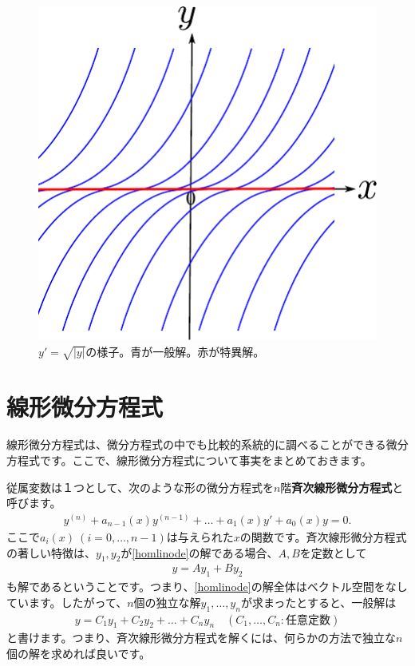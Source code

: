 \documentclass[report,paper=a4, fontsize=12pt, line_length=16cm, number_of_lines=33,dvipdfmx]{jlreq}
\numberwithin{equation}{section}
\newcommand{\strong}[1]{\textsf{\bfseries #1}}
\begin{document}
\begin{figure}[htbp]
  \centering
  \includegraphics{singularsolution.pdf}
  \caption{$y'=\sqrt{|y|}$の様子。青が一般解。赤が特異解。}
  \label{fig:singularsolution}
\end{figure}


\section{線形微分方程式}
線形微分方程式は、微分方程式の中でも比較的系統的に調べることができる微分方程式です。ここで、線形微分方程式について事実をまとめておきます。

従属変数は１つとして、次のような形の微分方程式を$n$階\strong{斉次線形微分方程式}と呼びます。
\begin{align}
  y^{(n)}+a_{n-1}(x)y^{(n-1)}+\dots+a_1(x)y'+a_0(x)y=0.\label{homlinode}
\end{align}
ここで$a_i(x)\ (i=0,\dots,n-1)$は与えられた$x$の関数です。斉次線形微分方程式の著しい特徴は、$y_1,y_2$が\eqref{homlinode}の解である場合、$A,B$を定数として
\begin{align}
  y=Ay_1+By_2
\end{align}
も解であるということです。つまり、\eqref{homlinode}の解全体はベクトル空間をなしています。したがって、$n$個の独立な解$y_1,\dots,y_n$が求まったとすると、一般解は
\begin{align}
  y=C_1y_1+C_2y_2+\dots+C_ny_n\quad (C_1,\dots,C_n:\text{任意定数})
\end{align}
と書けます。つまり、斉次線形微分方程式を解くには、何らかの方法で独立な$n$個の解を求めれば良いです。
\end{document}
